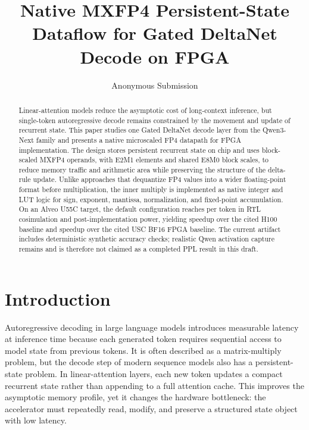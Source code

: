 \documentclass[conference]{IEEEtran}
\title{Native MXFP4 Persistent-State Dataflow for Gated DeltaNet Decode on FPGA}
\author{Anonymous Submission}
\begin{document}
\maketitle

\begin{abstract}
Linear-attention models reduce the asymptotic cost of long-context inference, but
single-token autoregressive decode remains constrained by the movement and update
of recurrent state. This paper studies one Gated DeltaNet decode layer from the
Qwen3-Next family and presents a native microscaled FP4 datapath for FPGA
implementation. The design stores persistent recurrent state on chip and uses
block-scaled MXFP4 operands, with E2M1 elements and shared E8M0 block scales, to
reduce memory traffic and arithmetic area while preserving the structure of the
delta-rule update. Unlike approaches that dequantize FP4 values into a wider
floating-point format before multiplication, the inner multiply is implemented as
native integer and LUT logic for sign, exponent, mantissa, normalization, and
fixed-point accumulation. On an Alveo U55C target, the default configuration
reaches \OursMxfpFourBThirtyTwoLatencyUs per token in RTL cosimulation and
\OursMxfpFourBThirtyTwoPowerW post-implementation power, yielding
\HeadlineSpeedupVsHOneHundred speedup over the cited H100 baseline and
\HeadlineSpeedupVsUsc speedup over the cited USC BF16 FPGA baseline. The current
artifact includes deterministic synthetic accuracy checks; realistic Qwen
activation capture remains \QwenCaptureStatus and is therefore not claimed as a
completed PPL result in this draft.
\end{abstract}

\section{Introduction}

Autoregressive decoding in large language models introduces measurable latency at
inference time because each generated token requires sequential access to model
state from previous tokens. It is often described as a matrix-multiply problem,
but the decode step of modern sequence models also has a persistent-state
problem. In linear-attention layers, each new token updates a compact recurrent
state rather than appending to a full attention cache. This improves the
asymptotic memory profile, yet it changes the hardware bottleneck: the
accelerator must repeatedly read, modify, and preserve a structured state object
with low latency.
\end{document}
